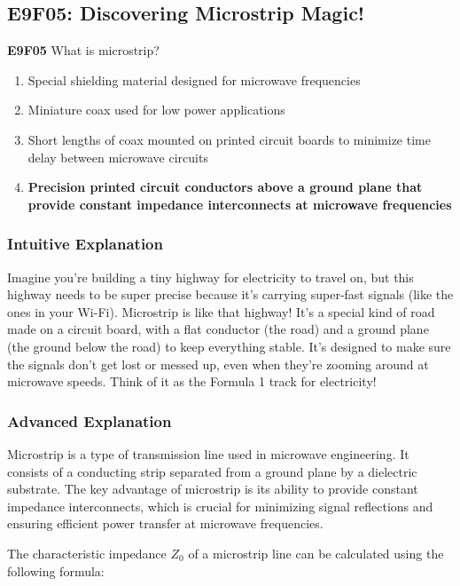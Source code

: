 \subsection{E9F05: Discovering Microstrip Magic!}

\begin{tcolorbox}[colback=gray!10!white,colframe=black!75!black]
    \textbf{E9F05} What is microstrip?  
    \begin{enumerate}[label=\Alph*)]
        \item Special shielding material designed for microwave frequencies
        \item Miniature coax used for low power applications
        \item Short lengths of coax mounted on printed circuit boards to minimize time delay between microwave circuits
        \item \textbf{Precision printed circuit conductors above a ground plane that provide constant impedance interconnects at microwave frequencies}
    \end{enumerate}
\end{tcolorbox}

\subsubsection{Intuitive Explanation}
Imagine you’re building a tiny highway for electricity to travel on, but this highway needs to be super precise because it’s carrying super-fast signals (like the ones in your Wi-Fi). Microstrip is like that highway! It’s a special kind of road made on a circuit board, with a flat conductor (the road) and a ground plane (the ground below the road) to keep everything stable. It’s designed to make sure the signals don’t get lost or messed up, even when they’re zooming around at microwave speeds. Think of it as the Formula 1 track for electricity!

\subsubsection{Advanced Explanation}
Microstrip is a type of transmission line used in microwave engineering. It consists of a conducting strip separated from a ground plane by a dielectric substrate. The key advantage of microstrip is its ability to provide constant impedance interconnects, which is crucial for minimizing signal reflections and ensuring efficient power transfer at microwave frequencies.

The characteristic impedance \( Z_0 \) of a microstrip line can be calculated using the following formula:

